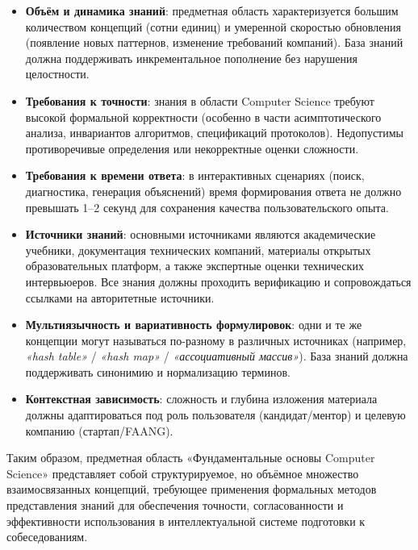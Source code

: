 \begin{itemize}
    \item \textbf{Объём и динамика знаний}: предметная область характеризуется большим количеством концепций (сотни единиц) и умеренной скоростью обновления (появление новых паттернов, изменение требований компаний). База знаний должна поддерживать инкрементальное пополнение без нарушения целостности.
    
    \item \textbf{Требования к точности}: знания в области Computer Science требуют высокой формальной корректности (особенно в части асимптотического анализа, инвариантов алгоритмов, спецификаций протоколов). Недопустимы противоречивые определения или некорректные оценки сложности.
    
    \item \textbf{Требования к времени ответа}: в интерактивных сценариях (поиск, диагностика, генерация объяснений) время формирования ответа не должно превышать 1–2 секунд для сохранения качества пользовательского опыта.
    
    \item \textbf{Источники знаний}: основными источниками являются академические учебники, документация технических компаний, материалы открытых образовательных платформ, а также экспертные оценки технических интервьюеров. Все знания должны проходить верификацию и сопровождаться ссылками на авторитетные источники.
    
    \item \textbf{Мультиязычность и вариативность формулировок}: одни и те же концепции могут называться по-разному в различных источниках (например, \textit{«hash table»} / \textit{«hash map»} / \textit{«ассоциативный массив»}). База знаний должна поддерживать синонимию и нормализацию терминов.
    
    \item \textbf{Контекстная зависимость}: сложность и глубина изложения материала должны адаптироваться под роль пользователя (кандидат/ментор) и целевую компанию (стартап/FAANG).
\end{itemize}

Таким образом, предметная область «Фундаментальные основы Computer Science» представляет собой структурируемое, но объёмное множество взаимосвязанных концепций, требующее применения формальных методов представления знаний для обеспечения точности, согласованности и эффективности использования в интеллектуальной системе подготовки к собеседованиям.

